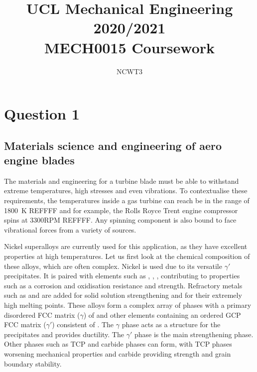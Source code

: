 \documentclass[11pt]{article}
\numberwithin{equation}{section}
\begin{document}
\title{\textbf{UCL Mechanical Engineering 2020/2021}\\MECH0015 Coursework}
\author{NCWT3}
\maketitle
\tableofcontents
\listoffigures
\section{Question 1}
\subsection{Materials science and engineering of aero engine blades}
The materials and engineering for a turbine blade must be able to withstand extreme temperatures, high stresses and even vibrations. To contextualise these requirements, the temperatures inside a gas turbine can reach be in the range of \SI{1800}{\kelvin} REFFFF and for example, the Rolls Royce Trent engine compressor spins at 3300RPM REFFFF. Any spinning component is also bound to face vibrational forces from a variety of sources. 

Nickel superalloys are currently used for this application, as they have excellent properties at high temperatures. Let us first look at the chemical composition of these alloys, which are often complex. Nickel is used due to its versatile $\gamma '$ precipitates. It is paired with elements such as , , ,  contributing to properties such as a corrosion and oxidisation resistance and strength. Refractory metals such as  and  are added for solid solution strengthening and for their extremely high melting points. These alloys form a complex array of phases with a primary disordered FCC matrix ($\gamma$) of  and other elements containing an ordered GCP FCC matrix ($\gamma '$) consistent of . The $\gamma$ phase acts as a structure for the precipitates and provides ductility. The $\gamma '$ phase is the main strengthening phase. Other phases such as TCP and carbide phases can form, with TCP phases worsening mechanical properties and carbide providing strength and grain boundary stability. 
\end{document}
